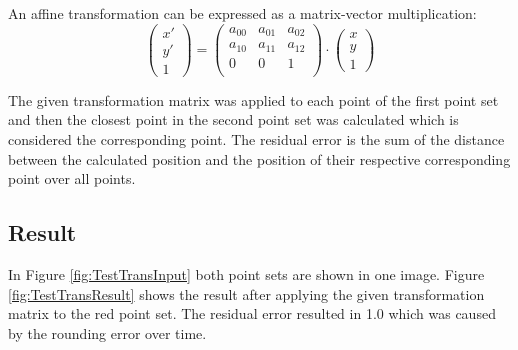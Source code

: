 An affine transformation can be expressed as a matrix-vector multiplication:
\begin{equation}
	\begin{pmatrix}
		x' \\
		y' \\
		1
	\end{pmatrix}
	= 
	\begin{pmatrix}
		a_{00} & a_{01} & a_{02} \\
		a_{10} & a_{11} & a_{12} \\
		0 & 0 & 1 \\
	\end{pmatrix} 
	\cdot
	\begin{pmatrix}
		x \\
		y \\
		1
	\end{pmatrix}
\end{equation}

The given transformation matrix was applied to each point of the first point set and then the closest point in the second point set was calculated which is considered the corresponding point. The residual error is the sum of the distance between the calculated position and the position of their respective corresponding point over all points. 

\subsection{Result}

In Figure \ref{fig:TestTransInput} both point sets are shown in one image. Figure \ref{fig:TestTransResult} shows the result after applying the given transformation matrix to the red point set. The residual error resulted in 1.0 which was caused by the rounding error over time. 

